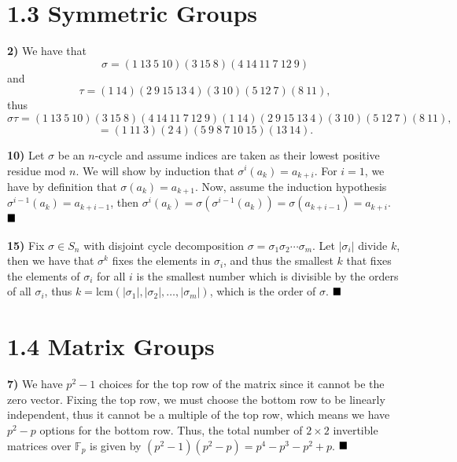\documentclass[12pt]{article}
\newcommand{\F}{\mathbb{F}}
\newcommand{\vertb}[1]{\left\vert#1\right\vert}
\newcommand{\done}{\ensuremath{\strut\hfill\blacksquare}}
\begin{document}
\pagestyle{fancy}

\setlength{\parindent}{0in}
\setlength{\parskip}{0.1in}

\section*{1.3 Symmetric Groups}

\textbf{2)} We have that
\[
	\sigma = (1 \ 13 \ 5 \ 10)(3 \ 15 \ 8)(4 \ 14 \ 11 \ 7 \ 12 \ 9)
\]
and
\[
	\tau = (1 \ 14)(2 \ 9 \ 15 \ 13 \ 4)(3 \ 10)(5 \ 12 \ 7)(8 \ 11),
\]
thus
\[
	\sigma\tau
	= (1 \ 13 \ 5 \ 10)(3 \ 15 \ 8)(4 \ 14 \ 11 \ 7 \ 12 \ 9) 
	(1 \ 14)(2 \ 9 \ 15 \ 13 \ 4)(3 \ 10)(5 \ 12 \ 7)(8 \ 11),
\]
\[
	= (1 \ 11 \ 3)(2 \ 4)(5 \ 9 \ 8 \ 7 \ 10 \ 15)(13 \ 14).
\]

\textbf{10)} Let \( \sigma \) be an \( n \)-cycle and assume indices are taken
as their lowest positive residue mod \( n \).
We will show by induction that \( \sigma^i(a_k) = a_{k + i} \).
For \( i = 1 \), we have by definition that \( \sigma(a_k) = a_{k + 1} \).
Now, assume the induction hypothesis \( \sigma^{i - 1}(a_k) = a_{k + i - 1} \),
then
\(
	\sigma^i(a_k)
	= \sigma(\sigma^{i - 1}(a_k))
	= \sigma(a_{k + i - 1})
	= a_{k + i}.
\)
\done

\textbf{15)} Fix \( \sigma \in S_n \) with disjoint cycle decomposition
\( \sigma = \sigma_1\sigma_2 \cdots \sigma_m \).
Let \( \vertb{\sigma_i} \) divide \( k \), then we have that \( \sigma^k \)
fixes the elements in \( \sigma_i \), and thus the smallest \( k \) that
fixes the elements of \( \sigma_i \) for all \( i \) is the smallest number
which is divisible by the orders of all \( \sigma_i \), thus
\(
	k
	= \text{lcm}(\vertb{\sigma_1}, \vertb{\sigma_2}, \dots, \vertb{\sigma_m})
\),
which is the order of \( \sigma \).
\done

\section*{1.4 Matrix Groups}

\textbf{7)} We have \( p^2 - 1 \) choices for the top row of the matrix since
it cannot be the zero vector.
Fixing the top row, we must choose the bottom row to be linearly independent,
thus it cannot be a multiple of the top row, which means we have \( p^2 - p \)
options for the bottom row.
Thus, the total number of \( 2 \times 2 \) invertible matrices over \( \F_p \)
is given by \( (p^2 - 1)(p^2 - p) = p^4 - p^3 - p^2 + p \).
\done
\end{document}
